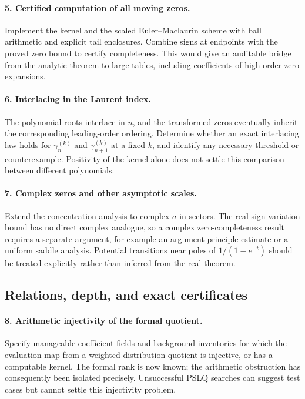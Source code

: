 \documentclass[11pt,a4paper]{article}
\theoremstyle{definition}
\theoremstyle{remark}
\numberwithin{equation}{section}
\begin{document}
\paragraph{5. Certified computation of all moving zeros.}
Implement the kernel and the scaled Euler--Maclaurin scheme with ball
arithmetic and explicit tail enclosures.  Combine signs at endpoints
with the proved zero bound to certify completeness.  This would give
an auditable bridge from the analytic theorem to large tables,
including coefficients of high-order zero expansions.

\paragraph{6. Interlacing in the Laurent index.}
The polynomial roots interlace in $n$, and the transformed zeros
eventually inherit the corresponding leading-order ordering.
Determine whether an exact interlacing law holds for
$\gamma_n^{(k)}$ and $\gamma_{n+1}^{(k)}$ at a fixed $k$, and identify
any necessary threshold or counterexample.  Positivity of the kernel
alone does not settle this comparison between different polynomials.

\paragraph{7. Complex zeros and other asymptotic scales.}
Extend the concentration analysis to complex $a$ in sectors.
The real sign-variation bound has no direct complex analogue, so a
complex zero-completeness result requires a separate argument, for
example an argument-principle estimate or a uniform saddle analysis.
Potential transitions near poles of $1/(1-e^{-t})$ should be treated
explicitly rather than inferred from the real theorem.

\subsection{Relations, depth, and exact certificates}

\paragraph{8. Arithmetic injectivity of the formal quotient.}
Specify manageable coefficient fields and background inventories for
which the evaluation map from a weighted distribution quotient is
injective, or has a computable kernel.  The formal rank is now known;
the arithmetic obstruction has consequently been isolated precisely.
Unsuccessful PSLQ searches can suggest test cases but cannot settle
this injectivity problem.
\end{document}
